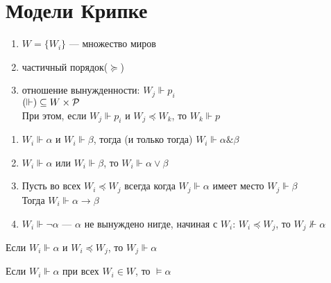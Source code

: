 \documentclass[english]{article}
\begin{document}
\section{Модели Крипке}
\label{sec:orga72f767}
\begin{center}
\end{center}
\begin{defintion}
	\-
	\begin{enumerate}
		\item \(W = \{W_i\}\) --- множество миров
		\item частичный порядок(\(\succeq\))
		\item отношение вынужденности: \(W_j \Vdash p_i\) \\
		      \((\Vdash)  \subseteq W \times \P\) \\
		      При этом, если \(W_j \Vdash p_i\) и \(W_j \preceq W_k\), то \(W_k \Vdash p\)
	\end{enumerate}
	\label{org8f83648}
\end{defintion}
\begin{definition}
	\-
	\begin{enumerate}
		\item \(W_i \Vdash \alpha\) и \(W_i \Vdash \beta\), тогда (и только тогда) \(W_i \Vdash \alpha \& \beta\) \\
		\item \(W_i \Vdash \alpha\) или \(W_i \Vdash \beta\), то \(W_i \Vdash \alpha \vee \beta\)
		\item Пусть во всех \(W_i \preceq W_j\) всегда когда \(W_j \Vdash \alpha\) имеет место \(W_j \Vdash \beta\) \\
		      Тогда \(W_i \Vdash \alpha \to \beta\)
		\item \(W_i \Vdash \neg \alpha\) --- \(\alpha\) не вынуждено нигде, начиная с \(W_i\):
		      \(W_i \preceq W_j\), то \(W_j \not\Vdash \alpha\)
	\end{enumerate}
	\label{orge32b2c9}
\end{definition}
\begin{theorem}
	Если \(W_i \Vdash \alpha\) и \(W_i \preceq W_j\), то \(W_j \Vdash \alpha\)
	\label{orga642aa1}
\end{theorem}
\begin{definition}
	Если \(W_i \Vdash \alpha\) при всех \(W_i \in W\), то \(\vDash \alpha\)
	\label{org57f714b}
\end{definition}
\end{document}
